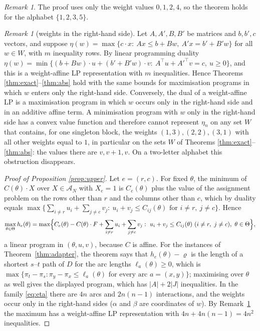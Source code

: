 \documentclass[11pt]{amsart}
\theoremstyle{plain}
\theoremstyle{definition}
\theoremstyle{remark}
\newtheorem{remark}[theorem]{Remark}
\newcommand{\cA}{\mathcal{A}}
\begin{document}
\begin{remark}\label{rem:letters}
The proof uses only the weight values $0,1,2,4$, so the theorem holds for the alphabet $\{1,2,3,5\}$.
\end{remark}

\begin{remark}[weights in the right-hand side]\label{rem:rhs}
Let $A,A',B,B'$ be matrices and $b,b',c$ vectors, and suppose
$\eta(w)=\max\{c\cdot x:\ Ax\le b+Bw,\ A'x=b'+B'w\}$ for all $w\in W$, with $m$ inequality rows. By
linear programming duality $\eta(w)=\min\{(b+Bw)\cdot u+(b'+B'w)\cdot v:\ A^{\top}u+A'^{\top}v=c,\ u\ge0\}$, and
this is a weight-affine LP representation with $m$ inequalities. Hence Theorems
\ref{thm:exact}--\ref{thm:abs} hold with the same bounds for maximisation programs in which $w$ enters only the
right-hand side. Conversely, the dual of a weight-affine LP is a maximisation program in which $w$ occurs only in
the right-hand side and in an additive affine term. A minimisation program with $w$ only in the right-hand side has
a convex value function and therefore cannot represent $\eta_n$ on any set $W$ that contains, for one singleton
block, the weights $(1,3),(2,2),(3,1)$ with all other weights equal to $1$, in particular on the sets $W$ of
Theorems \ref{thm:exact}--\ref{thm:abs}: the values there are $v,v+1,v$. On a two-letter alphabet this obstruction
disappears.
\end{remark}

\begin{proof}[Proof of Proposition \ref{prop:upper}]
Let $e=(r,c)$. For fixed $\theta$, the minimum of $C(\theta)\cdot X$ over $X\in\cA_N$ with $X_e=1$ is $C_e(\theta)$ plus
the value of the assignment problem on the rows other than $r$ and the columns other than $c$, which by duality
equals $\max\{\sum_{i\ne r}u_i+\sum_{j\ne c}v_j:\ u_i+v_j\le C_{ij}(\theta)\text{ for }i\ne r,\ j\ne c\}$. Hence
\[
 \max_{\theta\in\Theta}h_e(\theta)=\max\Bigl\{C_e(\theta)-C(\theta)\cdot F+\sum_{i\ne r}u_i+\sum_{j\ne c}v_j:\
 u_i+v_j\le C_{ij}(\theta)\ (i\ne r,\ j\ne c),\ \theta\in\Theta\Bigr\},
\]
a linear program in $(\theta,u,v)$, because $C$ is affine. For the instances of Theorem~\ref{thm:adapter}, the
theorem says that $h_e(\theta)-\varrho$ is the length of a shortest $s$--$t$ path of $D$ for the arc lengths
$\ell_a(\theta)\ge0$, which is $\max\{\pi_t-\pi_s:\pi_y-\pi_x\le\ell_a(\theta)\text{ for every arc }a=(x,y)\}$;
maximising over $\theta$ as well gives the displayed program, which has $|A|+2|J|$ inequalities. In the family
\eqref{eq:eta} there are $4n$ arcs and $2n(n-1)$ interactions, and the weights occur only in the right-hand sides
($\alpha$ and $\beta$ are coordinates of $w$). By Remark~\ref{rem:rhs} the maximum has a weight-affine LP
representation with $4n+4n(n-1)=4n^2$ inequalities.
\end{proof}
\end{document}
